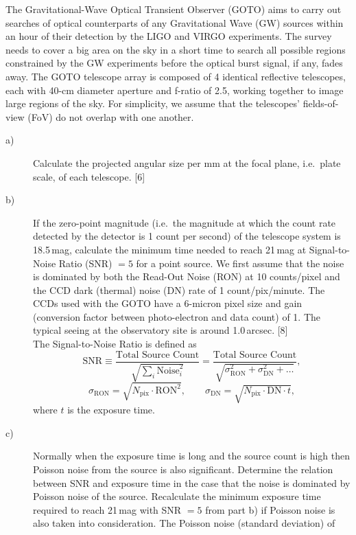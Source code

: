 The Gravitational-Wave Optical Transient Observer (GOTO) aims to carry out
searches of optical counterparts of any Gravitational Wave (GW) sources within
an hour of their detection by the LIGO and VIRGO experiments. The survey needs
to cover a big area on the sky in a short time to search all possible regions
constrained by the GW experiments before the optical burst signal, if any,
fades away. The GOTO telescope array is composed of 4 identical reflective
telescopes, each with 40-cm diameter aperture and f-ratio of 2.5, working
together to image large regions of the sky. For simplicity, we assume that the
telescopes' fields-of-view (FoV) do not overlap with one another.

\begin{description}
\item[a)] Calculate the projected angular size per mm at the focal plane, i.e.\
  plate scale, of each telescope. \hfill[6]
\item[b)] If the zero-point magnitude (i.e.\ the magnitude at which the count
  rate detected by the detector is 1 count per second) of the telescope system
  is 18.5\,mag, calculate the minimum time needed to reach 21\,mag at
  Signal-to-Noise Ratio (SNR) $= 5$ for a point source. We first assume that
  the noise is dominated by both the Read-Out Noise (RON) at 10 counts/pixel
  and the CCD dark (thermal) noise (DN) rate of 1 count/pix/minute. The CCDs
  used with the GOTO have a 6-micron pixel size and gain (conversion factor
  between photo-electron and data count) of 1. The typical seeing at the
  observatory site is around 1.0\,arcsec. \hfill[8]\\
  The Signal-to-Noise Ratio is defined as
  \[ \mathrm{SNR} \equiv
     \frac{\text{Total Source Count}}{\sqrt{\sum_i \mathrm{Noise}_i^2}}
     = \frac{\text{Total Source Count}}
            {\sqrt{\sigma_{\mathrm{RON}}^2 + \sigma_{\mathrm{DN}}^2 + \dots}},
  \]
  \[ \sigma_{\mathrm{RON}} = \sqrt{N_{\mathrm{pix}} \cdot \mathrm{RON}^2},
     \qquad
     \sigma_{\mathrm{DN}} = \sqrt{N_{\mathrm{pix}} \cdot \mathrm{DN} \cdot t},
  \]
  where $t$ is the exposure time.
\item[c)] Normally when the exposure time is long and the source count is high
  then Poisson noise from the source is also significant. Determine the
  relation between SNR and exposure time in the case that the noise is
  dominated by Poisson noise of the source. Recalculate the minimum exposure
  time required to reach 21\,mag with SNR $= 5$ from part b) if Poisson noise
  is also taken into consideration. The Poisson noise (standard deviation) of

\end{description}
